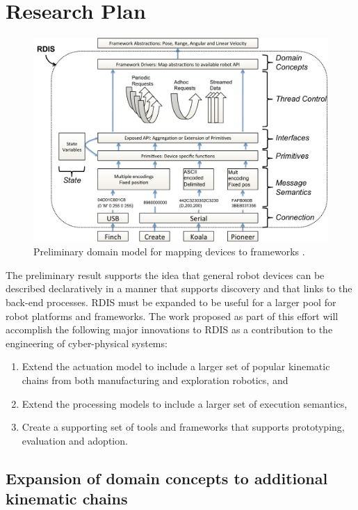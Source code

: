 
\section{Research Plan}
\label{sec:research-plan}

\begin{figure}[thpb]
      \centering
      \includegraphics[width=6in]{images/dm.pdf}
      \caption{Preliminary domain model for mapping devices to frameworks \cite{Anderson2012}.}
      \label{dm}
\end{figure}

The preliminary result supports the idea that general robot devices can be described declaratively in a manner that supports discovery and that links to the back-end processes.  RDIS must be expanded to be useful for a larger pool for robot platforms and frameworks.  The work proposed as part of this effort will accomplish the following major innovations to RDIS as a contribution to the engineering of cyber-physical systems: 
\begin{enumerate}
\item Extend the actuation model to include a larger set of popular kinematic chains from both manufacturing and exploration robotics, and
\item Extend the processing models to include a larger set of execution semantics, 
\item Create a supporting set of tools and frameworks that supports prototyping, evaluation and adoption.   
\end{enumerate}

\subsection{Expansion of domain concepts to additional kinematic chains}
\label{sec:kin}

